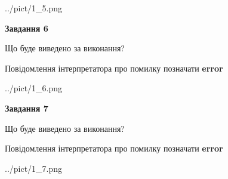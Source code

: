 \documentclass[10pt, ukrainian]{article}
\begin{document}
{\begin {large}
\begin{center}
	{../pict/1_5.png}
\end{center}
\newpage

{\begin {center}\textbf{Завдання 6}\end {center}}\par
Що буде виведено за виконання? \par
Повідомлення інтерпретатора про помилку позначати \textbf{error}

\begin{center}
	{../pict/1_6.png}
\end{center}
\newpage

{\begin {center}\textbf{Завдання 7}\end {center}}\par
Що буде виведено за виконання? \par
Повідомлення інтерпретатора про помилку позначати \textbf{error}

\begin{center}
	{../pict/1_7.png}
\end{center}
\newpage

\end {large}}
\end{document}
